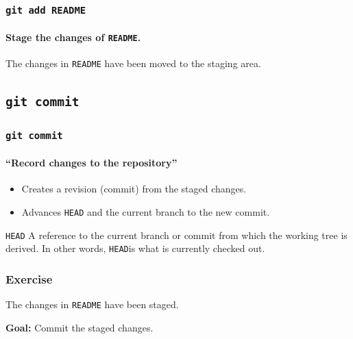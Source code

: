 \documentclass{beamer}
\newcommand\gitcmd[1]{\texttt{git #1}}
\newcommand\gHEAD{\texttt{HEAD}}
\newcommand\goal[1]{\textbf{Goal:} #1}
\begin{document}
\begin{frame}
  \frametitle{\gitcmd{add README}}
  \framesubtitle{Stage the changes of \texttt{README}.}
  \begin{figure}
    \centering
  \end{figure}
  The changes in \texttt{README} have been moved to the staging area.
\end{frame}

\subsection{\gitcmd{commit}}

\begin{frame}
  \frametitle{\gitcmd{commit}}
  \framesubtitle{``Record changes to the repository''}
  \begin{itemize}
    \item Creates a revision (commit) from the staged changes.
    \item Advances \gHEAD{} and the current branch to the new commit.
  \end{itemize}
  \vfill
  \begin{block}{\gHEAD{}}
    A reference to the current branch or commit from which the working tree is derived. In other words, \gHEAD is what is currently checked out.
  \end{block}
\end{frame}

\begin{frame}
  \frametitle{Exercise}
  The changes in \texttt{README} have been staged.

  \goal{Commit the staged changes.}

  \begin{figure}
    \centering
  \end{figure}
\end{frame}
\end{document}

